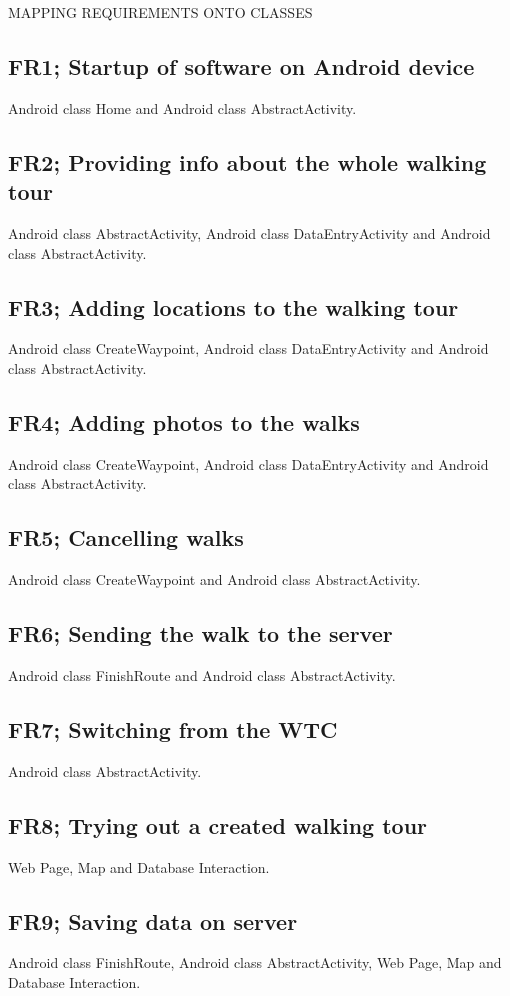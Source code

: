 \documentclass{article}
\begin{document}
	\clearpage
	\begin{section}{MAPPING REQUIREMENTS ONTO CLASSES}
		\subsection{FR1; Startup of software on Android device}
		Android class Home and Android class AbstractActivity.

		\subsection{FR2; Providing info about the whole walking tour}
		Android class AbstractActivity, Android class DataEntryActivity
		and Android class AbstractActivity.

		\subsection{FR3; Adding locations to the walking tour}
		Android class CreateWaypoint, Android class DataEntryActivity
		and Android class AbstractActivity.

		\subsection{FR4; Adding photos to the walks}
		Android class CreateWaypoint, Android class DataEntryActivity 
		and Android class AbstractActivity.

		\subsection{FR5; Cancelling walks}
		Android class CreateWaypoint and Android class AbstractActivity.

		\subsection{FR6; Sending the walk to the server}
		Android class FinishRoute and Android class AbstractActivity.

		\subsection{FR7; Switching from the WTC}
		Android class AbstractActivity.

		\subsection{FR8; Trying out a created walking tour}
		Web Page, Map and Database Interaction.

		\subsection{FR9; Saving data on server}
		Android class FinishRoute, Android class AbstractActivity, Web Page, Map and Database Interaction.
	\end{section}
	
\end{document}

